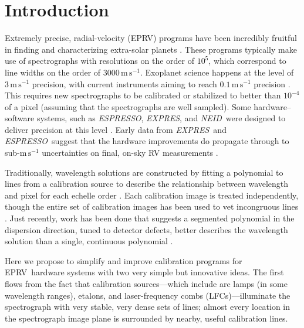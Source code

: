 \documentclass[modern]{aastex63}
\newcommand{\project}[1]{\textsl{#1}}
\newcommand{\acronym}[1]{{\small{#1}}}
\newcommand{\expres}{\project{\acronym{EXPRES}}}
\newcommand{\espresso}{\project{\acronym{ESPRESSO}}}
\newcommand{\neid}{\project{\acronym{NEID}}}
\newcommand{\eprv}{\acronym{EPRV}}
\newcommand{\lfc}{\acronym{LFC}}
\newcommand{\mps}{\mathrm{m\,s^{-1}}}
\begin{document}

\section{Introduction} 
Extremely precise, radial-velocity (\eprv) programs have been incredibly fruitful in finding and characterizing extra-solar planets \citep{mayor2011, bonfils2013, plavchan2015, butler2017}.  These programs typically make use of spectrographs with resolutions on the order of $10^5$, which correspond to line widths on the order of $3000\,\mps$.  Exoplanet science happens at the level of $3\,\mps$ precision, with current instruments aiming to reach $0.1\,\mps$ precision \citep{fischer2016}.  This requires new spectrographs to be calibrated or stabilized to better than $10^{-4}$ of a pixel (assuming that the spectrographs are well sampled).    Some hardware--software systems, such as \espresso, \expres, and \neid\ were designed to deliver precision at this level \citep{pepe2013,  jurgenson2016, neid}.  Early data from \expres\ and \espresso\ suggest that the hardware improvements do propagate through to sub-$\mps$ uncertainties on final, on-sky RV measurements \citep{blackman2020, petersburg2020, pepe2020}.

Traditionally, wavelength solutions are constructed by fitting a polynomial to lines from a calibration source to describe the relationship between wavelength and pixel for each echelle order \citep{lovis2007, cersullo2019}.  Each calibration image is treated independently, though the entire set of calibration images has been used to vet incongruous lines \citep{coffinet2019}.  Just recently, work has been done that suggests a segmented polynomial in the dispersion direction, tuned to detector defects, better describes the wavelength solution than a single, continuous polynomial \citep{milakovic2020}.

Here we propose to simplify and improve calibration programs for \eprv\ hardware systems with two very simple but innovative ideas.  The first flows from the fact that calibration sources---which include arc lamps (in some wavelength ranges), etalons, and laser-frequency combs (\lfc s)---illuminate the spectrograph with very stable, very dense sets of lines; almost every location in the spectrograph image plane is surrounded by nearby, useful calibration lines.
\end{document}
